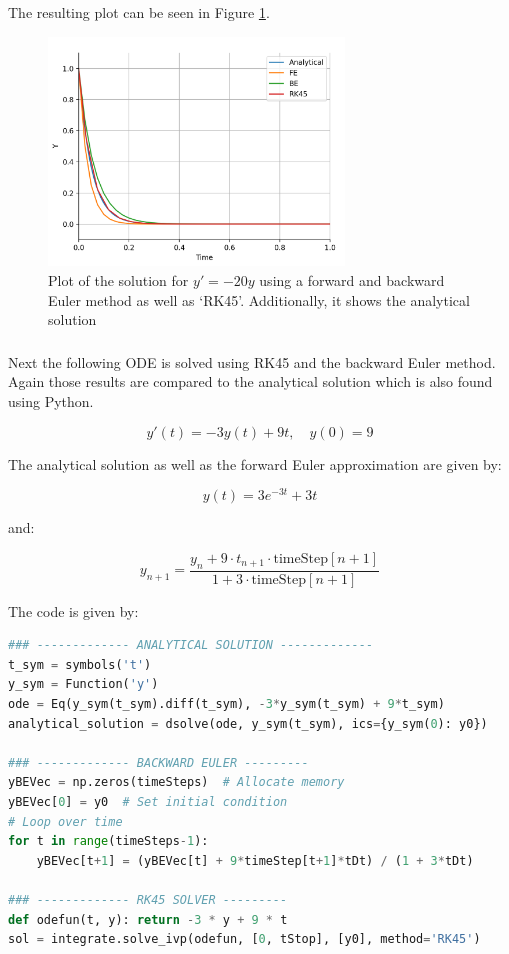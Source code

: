 \documentclass{article}
\begin{document}
    \vspace{10pt}
    The resulting plot can be seen in Figure \ref{fig:RK45}.

    \begin{figure}[h!]
        \centering
        \includegraphics[width=0.7\textwidth]{RK45.png}
        \caption{Plot of the solution for $y'=-20y$ using a forward and backward Euler method as well as ‘RK45’. Additionally, it shows the analytical solution}
        \label{fig:RK45}
    \end{figure}

    \subsubsection{}
    Next the following ODE is solved using RK45 and the backward Euler method. Again those results are compared to the analytical solution which is also found using Python.

    \[ y'(t) = -3y(t) + 9t, \quad y(0) = 9 \]

    The analytical solution as well as the forward Euler approximation are given by:

    \[ y(t) = 3e^{-3t} + 3t \]

    and:

    \[ y_{n+1} = \frac{y_n + 9 \cdot t_{n+1} \cdot \text{{timeStep}}[n+1]}{1 + 3 \cdot \text{{timeStep}}[n+1]} \]

    \vspace{80pt}
    The code is given by:
    \begin{lstlisting}[language=Python, style=mystyle]
### ------------- ANALYTICAL SOLUTION -------------
t_sym = symbols('t')
y_sym = Function('y')
ode = Eq(y_sym(t_sym).diff(t_sym), -3*y_sym(t_sym) + 9*t_sym)
analytical_solution = dsolve(ode, y_sym(t_sym), ics={y_sym(0): y0})

### ------------- BACKWARD EULER ---------
yBEVec = np.zeros(timeSteps)  # Allocate memory
yBEVec[0] = y0  # Set initial condition
# Loop over time
for t in range(timeSteps-1):
    yBEVec[t+1] = (yBEVec[t] + 9*timeStep[t+1]*tDt) / (1 + 3*tDt)

### ------------- RK45 SOLVER ---------
def odefun(t, y): return -3 * y + 9 * t
sol = integrate.solve_ivp(odefun, [0, tStop], [y0], method='RK45')
    \end{lstlisting}
\end{document}
